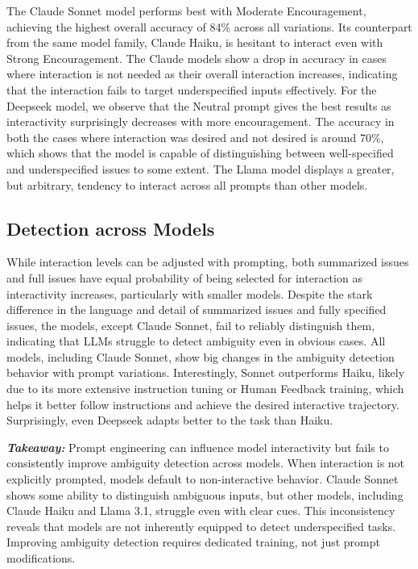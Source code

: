 The Claude Sonnet model performs best with Moderate Encouragement, achieving the highest overall accuracy of 84\% across all variations. Its counterpart from the same model family, Claude Haiku, is hesitant to interact even with Strong Encouragement. The Claude models show a drop in accuracy in cases where interaction is not needed as their overall interaction increases, indicating that the interaction fails to target underspecified inputs effectively. For the Deepseek model, we observe that the Neutral prompt gives the best results as interactivity surprisingly decreases with more encouragement. The accuracy in both the cases where interaction was desired and not desired is around 70\%, which shows that the model is capable of distinguishing between well-specified and underspecified issues to some extent. The Llama model displays a greater, but arbitrary, tendency to interact across all prompts than other models. 

\subsection{Detection across Models}
While interaction levels can be adjusted with prompting, both summarized issues and full issues have equal probability of being selected for interaction as interactivity increases, particularly with smaller models. Despite the stark difference in the language and detail of summarized issues and fully specified issues, the models, except Claude Sonnet, fail to reliably distinguish them, indicating that LLMs struggle to detect ambiguity even in obvious cases. All models, including Claude Sonnet, show big changes in the ambiguity detection behavior with prompt variations. Interestingly, Sonnet outperforms Haiku, likely due to its more extensive instruction tuning or Human Feedback training, which helps it better follow instructions and achieve the desired interactive trajectory. Surprisingly, even Deepseek adapts better to the task than Haiku.

\textbf{\textit{Takeaway:}}
Prompt engineering can influence model interactivity but fails to consistently improve ambiguity detection across models. When interaction is not explicitly prompted, models default to non-interactive behavior. Claude Sonnet shows some ability to distinguish ambiguous inputs, but other models, including Claude Haiku and Llama 3.1, struggle even with clear cues. This inconsistency reveals that models are not inherently equipped to detect underspecified tasks. Improving ambiguity detection requires dedicated training, not just prompt modifications.